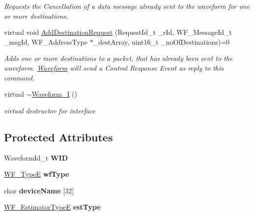 \begin{DoxyCompactItemize}
\begin{DoxyCompactList}\small\item\em Requests the Cancellation of a data message already sent to the waveform for one or more destinations. \end{DoxyCompactList}\item 
virtual void \hyperlink{class_waveform_1_1_waveform___i_ace837715041bdea1e7857ccd9858e3f2}{Add\+Destination\+Request} (Request\+Id\+\_\+t \+\_\+r\+Id, W\+F\+\_\+\+Message\+Id\+\_\+t \+\_\+msg\+Id, W\+F\+\_\+\+Address\+Type $\ast$\+\_\+dest\+Array, uint16\+\_\+t \+\_\+no\+Of\+Destinations)=0
\begin{DoxyCompactList}\small\item\em Adds one or more destinations to a packet, that has already been sent to the waveform. \hyperlink{namespace_waveform}{Waveform} will send a Control Response Event as reply to this command. \end{DoxyCompactList}\item 
virtual \hyperlink{class_waveform_1_1_waveform___i_a1f0f3d3a86e5b34ca19d84a5425ea7ba}{$\sim$\+Waveform\+\_\+I} ()\hypertarget{class_waveform_1_1_waveform___i_a1f0f3d3a86e5b34ca19d84a5425ea7ba}{}\label{class_waveform_1_1_waveform___i_a1f0f3d3a86e5b34ca19d84a5425ea7ba}

\begin{DoxyCompactList}\small\item\em virtual destructor for interface \end{DoxyCompactList}\end{DoxyCompactItemize}
\subsection*{Protected Attributes}
\begin{DoxyCompactItemize}
\item 
Waveform\+Id\+\_\+t {\bfseries W\+ID}\hypertarget{class_waveform_1_1_waveform___i_af7ee22c008f34e6ba23a8fe00f3db901}{}\label{class_waveform_1_1_waveform___i_af7ee22c008f34e6ba23a8fe00f3db901}

\item 
\hyperlink{namespace_waveform_a8362d1abeefedecd1142a174faedc096}{W\+F\+\_\+\+TypeE} {\bfseries wf\+Type}\hypertarget{class_waveform_1_1_waveform___i_a932ddf78b5aa0eab3b38f3ecddebb00a}{}\label{class_waveform_1_1_waveform___i_a932ddf78b5aa0eab3b38f3ecddebb00a}

\item 
char {\bfseries device\+Name} \mbox{[}32\mbox{]}\hypertarget{class_waveform_1_1_waveform___i_ae1d816e833a5a5941cb8fa3d8567508b}{}\label{class_waveform_1_1_waveform___i_ae1d816e833a5a5941cb8fa3d8567508b}

\item 
\hyperlink{namespace_waveform_a264307e95d31e27c5a69031fd2615f98}{W\+F\+\_\+\+Estimator\+TypeE} {\bfseries est\+Type}\hypertarget{class_waveform_1_1_waveform___i_a08a164eba2b7d5dceb88755dc39acaf4}{}\label{class_waveform_1_1_waveform___i_a08a164eba2b7d5dceb88755dc39acaf4}

\end{DoxyCompactItemize}


